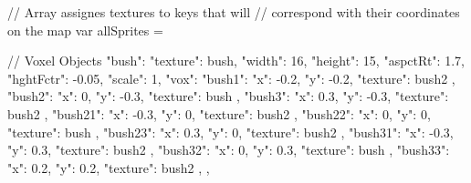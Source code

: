 // Array assignes textures to keys that will
// correspond with their coordinates on the map
var allSprites = {

  // Voxel Objects
  "bush": {
    "texture": bush,
    "width": 16,
    "height": 15,
    "aspctRt": 1.7,
    "hghtFctr": -0.05,
    "scale": 1,
    "vox": {
      "bush1":{ "x": -0.2, "y": -0.2, "texture": bush2 },
      "bush2":{ "x": 0, "y": -0.3, "texture": bush },
      "bush3":{ "x": 0.3, "y": -0.3, "texture": bush2 },
      "bush21":{ "x": -0.3, "y": 0, "texture": bush2 },
      "bush22":{ "x": 0, "y": 0, "texture": bush },
      "bush23":{ "x": 0.3, "y": 0, "texture": bush2 },
      "bush31":{ "x": -0.3, "y": 0.3, "texture": bush2 },
      "bush32":{ "x": 0, "y": 0.3, "texture": bush },
      "bush33":{ "x": 0.2, "y": 0.2, "texture": bush2 },
    }
  },  

}
